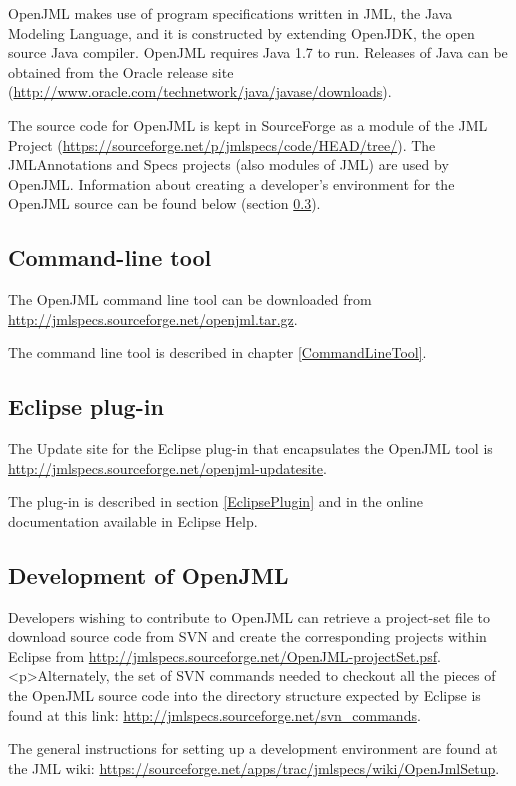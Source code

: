 \documentclass{report}%
\begin{document}
OpenJML makes use of program specifications written in JML, the Java Modeling Language, and
it is constructed by extending OpenJDK, the open source Java compiler.
OpenJML requires Java 1.7 to run.
Releases of Java can be obtained from the Oracle release site (\url{http://www.oracle.com/technetwork/java/javase/downloads}).

The source code for OpenJML is kept in SourceForge as a module of the 
JML Project (\url{https://sourceforge.net/p/jmlspecs/code/HEAD/tree/}).
The JMLAnnotations and Specs projects (also modules of JML) are used by OpenJML.
Information about creating a developer's environment for the OpenJML source
can be found below (section \ref{Development}).
 
\subsection{Command-line tool}

The OpenJML command line tool can be downloaded from
\url{http://jmlspecs.sourceforge.net/openjml.tar.gz}.

The command line tool is described in chapter \ref{CommandLineTool}.

\subsection{Eclipse plug-in}

The Update site for the Eclipse plug-in that encapsulates the OpenJML tool
is \url{http://jmlspecs.sourceforge.net/openjml-updatesite}.

The plug-in is described in section \ref{EclipsePlugin} and in the online documentation available in Eclipse Help.


\subsection{Development of OpenJML}
\label{Development}

Developers wishing to contribute to OpenJML can retrieve a project-set file to download source code from SVN and create the corresponding projects within Eclipse from 
\url{http://jmlspecs.sourceforge.net/OpenJML-projectSet.psf}.
<p>Alternately, the set of SVN commands needed to checkout all the pieces of the
OpenJML source code into the directory structure expected by Eclipse is found at this link: 
\url{http://jmlspecs.sourceforge.net/svn_commands}.

The general instructions for setting up a development environment are found at the JML wiki: \url{https://sourceforge.net/apps/trac/jmlspecs/wiki/OpenJmlSetup}.
\end{document}
